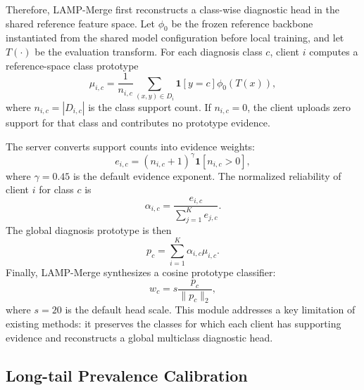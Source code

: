 \documentclass[letterpaper]{article} %
\begin{document}
Therefore, LAMP-Merge first reconstructs a class-wise diagnostic head in the shared reference feature space. Let $\phi_0$ be the frozen reference backbone instantiated from the shared model configuration before local training, and let $T(\cdot)$ be the evaluation transform. For each diagnosis class $c$, client $i$ computes a reference-space class prototype
\begin{equation}
\mu_{i,c}=\frac{1}{n_{i,c}}\sum_{(x,y)\in D_i}\mathbf{1}[y=c]\phi_0(T(x)),
\end{equation}
where $n_{i,c}=|D_{i,c}|$ is the class support count. If $n_{i,c}=0$, the client uploads zero support for that class and contributes no prototype evidence.

The server converts support counts into evidence weights:
\begin{equation}
e_{i,c}=(n_{i,c}+1)^\gamma \mathbf{1}[n_{i,c}>0],
\end{equation}
where $\gamma=0.45$ is the default evidence exponent. The normalized reliability of client $i$ for class $c$ is
\begin{equation}
\alpha_{i,c}=\frac{e_{i,c}}{\sum_{j=1}^{K} e_{j,c}}.
\end{equation}
The global diagnosis prototype is then
\begin{equation}
p_c=\sum_{i=1}^{K}\alpha_{i,c}\mu_{i,c}.
\end{equation}
Finally, LAMP-Merge synthesizes a cosine prototype classifier:
\begin{equation}
w_c=s\frac{p_c}{\|p_c\|_2},
\end{equation}
where $s=20$ is the default head scale. This module addresses a key limitation of existing methods: it preserves the classes for which each client has supporting evidence and reconstructs a global multiclass diagnostic head.

\subsection{Long-tail Prevalence Calibration}
\end{document}
